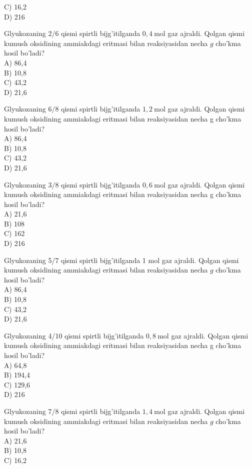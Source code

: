 C) 16,2\\
D) 216
  \item Glyukozaning 2/6 qismi spirtli bijg'itilganda $0,4 \mathrm{~mol}$ gaz ajraldi. Qolgan qismi kumush oksidining ammiakdagi eritmasi bilan reaksiyasidan necha $g$ cho'kma hosil bo'ladi?\\
A) 86,4\\
B) 10,8\\
C) 43,2\\
D) 21,6
  \item Glyukozaning $6 / 8$ qismi spirtli bijg'itilganda $1,2 \mathrm{~mol}$ gaz ajraldi. Qolgan qismi kumush oksidining ammiakdagi eritmasi bilan reaksiyasidan necha g cho'kma hosil bo'ladi?\\
A) 86,4\\
B) 10,8\\
C) 43,2\\
D) 21,6
  \item Glyukozaning $3 / 8$ qismi spirtli bijg'itilganda $0,6 \mathrm{~mol}$ gaz ajraldi. Qolgan qismi kumush oksidining ammiakdagi eritmasi bilan reaksiyasidan necha g cho'kma hosil bo'ladi?\\
A) 21,6\\
B) 108\\
C) 162\\
D) 216
  \item Glyukozaning 5/7 qismi spirtli bijg'itilganda 1 mol gaz ajraldi. Qolgan qismi kumush oksidining ammiakdagi eritmasi bilan reaksiyasidan necha $g$ cho'kma hosil bo'ladi?\\
A) 86,4\\
B) 10,8\\
C) 43,2\\
D) 21,6
  \item Glyukozaning 4/10 qismi spirtli bijg'itilganda $0,8 \mathrm{~mol}$ gaz ajraldi. Qolgan qismi kumush oksidining ammiakdagi eritmasi bilan reaksiyasidan necha g cho'kma hosil bo'ladi?\\
A) 64,8\\
B) 194,4\\
C) 129,6\\
D) 216
  \item Glyukozaning 7/8 qismi spirtli bijg'itilganda $1,4 \mathrm{~mol}$ gaz ajraldi. Qolgan qismi kumush oksidining ammiakdagi eritmasi bilan reaksiyasidan necha $g$ cho'kma hosil bo'ladi?\\
A) 21,6\\
B) 10,8\\
C) 16,2\\
